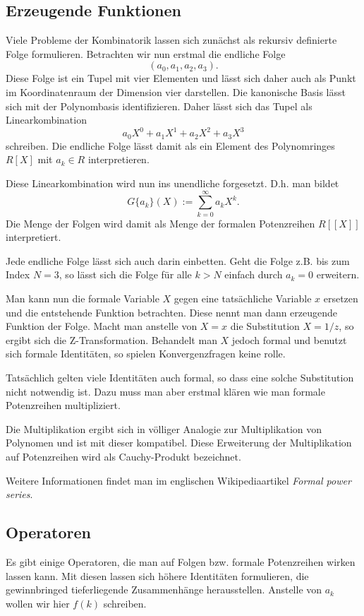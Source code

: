 \documentclass[a4paper,12pt,fleqn]{article}
\begin{document}
\subsection{Erzeugende Funktionen}
Viele Probleme der Kombinatorik lassen sich zunächst als
rekursiv definierte Folge formulieren. Betrachten wir nun erstmal
die endliche Folge
\[(a_0,a_1,a_2,a_3).\]
Diese Folge ist ein Tupel mit vier Elementen und lässt sich
daher auch als Punkt im Koordinatenraum der Dimension vier darstellen.
Die kanonische Basis lässt sich mit der Polynombasis identifizieren.
Daher lässt sich das Tupel als Linearkombination
\[a_0X^0+a_1X^1+a_2X^2+a_3X^3\]
schreiben. Die endliche Folge lässt damit als ein Element
des Polynomringes $R[X]$ mit $a_k\in R$ interpretieren.

Diese Linearkombination wird nun ins unendliche forgesetzt.
D.h. man bildet
\begin{equation}
G\{a_k\}(X) := \sum_{k=0}^\infty a_kX^k.
\end{equation}
Die Menge der Folgen wird damit als Menge der formalen
Potenzreihen $R[[X]]$ interpretiert.

Jede endliche Folge lässt sich auch darin einbetten.
Geht die Folge z.B. bis zum Index $N=3$, so lässt sich die Folge
für alle $k>N$ einfach durch $a_k=0$ erweitern.

Man kann nun die formale Variable $X$ gegen eine tatsächliche
Variable $x$ ersetzen und die entstehende Funktion betrachten.
Diese nennt man dann erzeugende Funktion der Folge. Macht man anstelle
von $X=x$ die Substitution $X=1/z$, so ergibt sich die
Z-Transformation. Behandelt man $X$ jedoch formal und
benutzt sich formale Identitäten, so spielen Konvergenzfragen
keine rolle.

Tatsächlich gelten viele Identitäten auch formal, so dass eine
solche Substitution nicht notwendig ist. Dazu muss man aber erstmal
klären wie man formale Potenzreihen multipliziert.

Die Multiplikation ergibt sich in völliger Analogie zur
Multiplikation von Polynomen und ist mit dieser kompatibel.
Diese Erweiterung der Multiplikation auf Potenzreihen wird
als Cauchy-Produkt bezeichnet.

Weitere Informationen findet man im englischen Wikipediaartikel
\textit{Formal power series}.


\subsection{Operatoren}
Es gibt einige Operatoren, die man auf Folgen bzw. formale
Potenzreihen wirken lassen kann. Mit diesen lassen sich höhere
Identitäten formulieren, die gewinnbringed tieferliegende
Zusammenhänge herausstellen. Anstelle von $a_k$ wollen wir
hier $f(k)$ schreiben.
\end{document}
